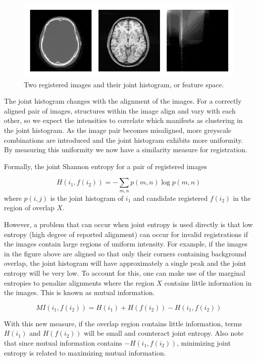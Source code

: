 \documentclass[tocnosub,noragright,centerchapter,12pt]{uiucecethesis09}
\begin{document}
\begin{figure}
  \centering
  \includegraphics[width=1\textwidth]{figures/feature_space.png}
  \caption{
    Two registered images and their joint histogram, or feature space.
  }
  \label{fig:joint_histogram}
\end{figure}

The joint histogram changes with the alignment of the images.  For a correctly aligned pair of images, structures within the image align and vary with each other, so we expect the intensities to correlate which manifests as clustering in the joint histogram.  As the image pair becomes misaligned, more greyscale combinations are introduced and the joint histogram exhibits more uniformity.  By measuring this uniformity we now have a similarity measure for registration.

Formally, the joint Shannon entropy for a pair of registered images

$$
H(i_1, f(i_2)) = -\sum_{m, n} p(m, n) \log p(m, n)
$$
where $p(i, j)$ is the joint histogram of $i_1$ and candidate registered $f(i_2)$ in the region of overlap $X$.

However, a problem that can occur when joint entropy is used directly is that low entropy (high degree of reported alignment) can occur for invalid registrations if the images contain large regions of uniform intensity.  For example, if the images in the figure above are aligned so that only their corners containing background overlap, the joint histogram will have approximately a single peak and the joint entropy will be very low.  To account for this, one can make use of the marginal entropies to penalize alignments where the region $X$ contains little information in the images.  This is known as mutual information.

$$
MI(i_1, f(i_2)) = H(i_1) + H(f(i_2)) - H(i_1, f(i_2))
$$

With this new measure, if the overlap region contains little information, terms $H(i_1)$ and $H(f(i_2))$ will be small and counteract joint entropy.  Also note that since mutual information contains $-H(i_1, f(i_2))$, minimizing joint entropy is related to maximizing mutual information.
\end{document}
